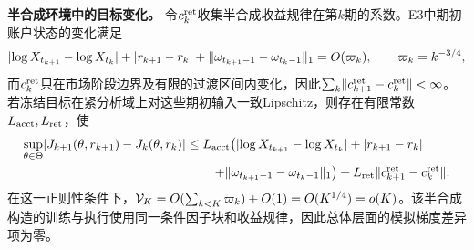 \par\smallskip\noindent\textbf{半合成环境中的目标变化。}\quad
令$c_k^{\rm ret}$收集半合成收益规律在第$k$期的系数。E3中期初账户状态的变化满足
\[
 \lvert\log X_{t_{k+1}}-\log X_{t_k}\rvert
 +\lvert r_{k+1}-r_k\rvert
 +\lVert\omega_{t_{k+1}-1}-\omega_{t_k-1}\rVert_1
 =O(\varpi_k),
 \qquad \varpi_k=k^{-3/4},
\]
而$c_k^{\rm ret}$只在市场阶段边界及有限的过渡区间内变化，因此$\sum_k\lVert c_{k+1}^{\rm ret}-c_k^{\rm ret}\rVert<\infty$。若冻结目标在紧分析域上对这些期初输入一致Lipschitz，则存在有限常数$L_{\rm acct},L_{\rm ret}$，使
\[
\begin{aligned}
 \sup_{\theta\in\Theta}
 \lvert J_{k+1}(\theta,r_{k+1})-J_k(\theta,r_k)\rvert
 &\le
 L_{\rm acct}\!\left(
 \lvert\log X_{t_{k+1}}-\log X_{t_k}\rvert
 +\lvert r_{k+1}-r_k\rvert
 \right.\\
 &\qquad\left.
 +\lVert\omega_{t_{k+1}-1}-\omega_{t_k-1}\rVert_1
 \right)
 +L_{\rm ret}\lVert c_{k+1}^{\rm ret}-c_k^{\rm ret}\rVert.
\end{aligned}
\]
在这一正则性条件下，$\mathcal V_K=O(\sum_{k<K}\varpi_k)+O(1)=O(K^{1/4})=o(K)$。该半合成构造的训练与执行使用同一条件因子块和收益规律，因此总体层面的模拟梯度差异项为零。
